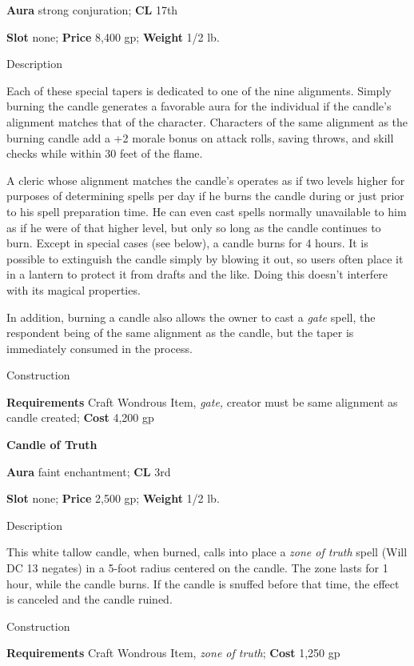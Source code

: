 \textbf{Aura} strong conjuration;\textbf{ CL }17th
				
\textbf{Slot} none; \textbf{Price} 8,400 gp; \textbf{Weight} 1/2 lb.
				
Description
				
Each of these special tapers is dedicated to one of the nine alignments. Simply burning the candle generates a favorable aura for the individual if the candle's alignment matches that of the character. Characters of the same alignment as the burning candle add a +2 morale bonus on attack rolls, saving throws, and skill checks while within 30 feet of the flame.
				
A cleric whose alignment matches the candle's operates as if two levels higher for purposes of determining spells per day if he burns the candle during or just prior to his spell preparation time. He can even cast spells normally unavailable to him as if he were of that higher level, but only so long as the candle continues to burn. Except in special cases (see below), a candle burns for 4 hours. It is possible to extinguish the candle simply by blowing it out, so users often place it in a lantern to protect it from drafts and the like. Doing this doesn't interfere with its magical properties.
				
In addition, burning a candle also allows the owner to cast a \textit{gate }spell, the respondent being of the same alignment as the candle, but the taper is immediately consumed in the process. 
				
Construction
				
\textbf{Requirements} Craft Wondrous Item, \textit{gate,} creator must be same alignment as candle created; \textbf{Cost }4,200 gp
				
\textbf{Candle of Truth}
				
\textbf{Aura} faint enchantment;\textbf{ CL }3rd
				
\textbf{Slot} none; \textbf{Price} 2,500 gp; \textbf{Weight} 1/2 lb.
				
Description
				
This white tallow candle, when burned, calls into place a \textit{zone of truth }spell (Will DC 13 negates) in a 5-foot radius centered on the candle. The zone lasts for 1 hour, while the candle burns. If the candle is snuffed before that time, the effect is canceled and the candle ruined. 
				
Construction
				
\textbf{Requirements} Craft Wondrous Item, \textit{zone of truth}; \textbf{Cost }1,250 gp
				
